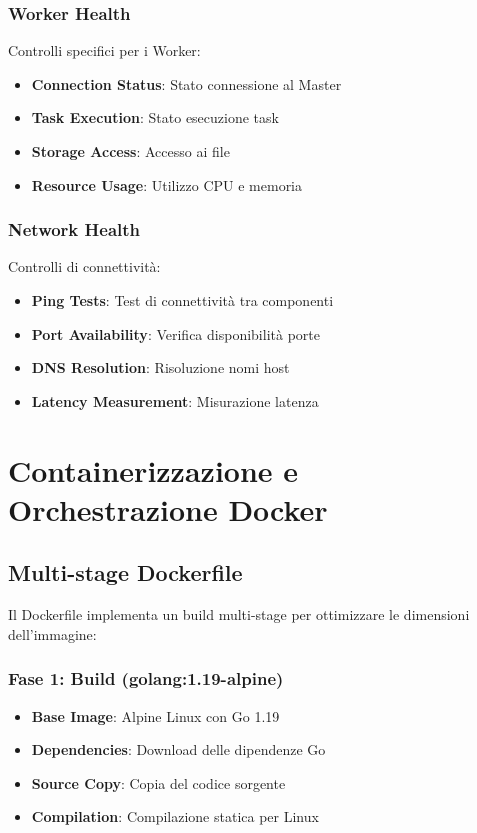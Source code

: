 \documentclass[12pt,a4paper]{article}
\begin{document}
\subsubsection{Worker Health}

Controlli specifici per i Worker:

\begin{itemize}
\item \textbf{Connection Status}: Stato connessione al Master
\item \textbf{Task Execution}: Stato esecuzione task
\item \textbf{Storage Access}: Accesso ai file
\item \textbf{Resource Usage}: Utilizzo CPU e memoria
\end{itemize}

\subsubsection{Network Health}

Controlli di connettività:

\begin{itemize}
\item \textbf{Ping Tests}: Test di connettività tra componenti
\item \textbf{Port Availability}: Verifica disponibilità porte
\item \textbf{DNS Resolution}: Risoluzione nomi host
\item \textbf{Latency Measurement}: Misurazione latenza
\end{itemize}

\section{Containerizzazione e Orchestrazione Docker}

\subsection{Multi-stage Dockerfile}

Il Dockerfile implementa un build multi-stage per ottimizzare le dimensioni dell'immagine:

\subsubsection{Fase 1: Build (golang:1.19-alpine)}

\begin{itemize}
\item \textbf{Base Image}: Alpine Linux con Go 1.19
\item \textbf{Dependencies}: Download delle dipendenze Go
\item \textbf{Source Copy}: Copia del codice sorgente
\item \textbf{Compilation}: Compilazione statica per Linux
\end{itemize}
\end{document}
